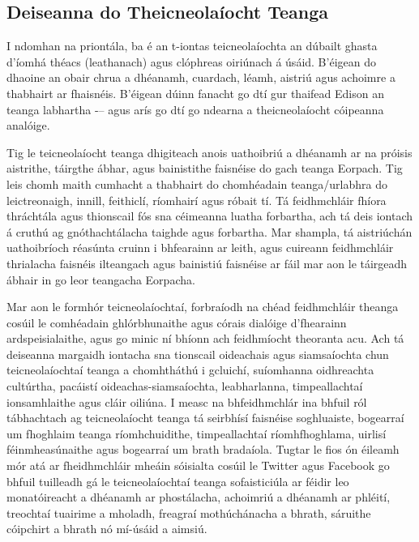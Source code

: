 \begin{multicols}{2}
\subsection{Deiseanna do Theicneolaíocht Teanga}

I ndomhan na priontála, ba é an t-iontas teicneolaíochta an dúbailt ghasta d'íomhá théacs (leathanach) agus clóphreas oiriúnach á úsáid. B’éigean do dhaoine an obair chrua a dhéanamh, cuardach, léamh, aistriú agus achoimre a thabhairt ar fhaisnéis. B’éigean dúinn fanacht go dtí gur thaifead Edison an teanga labhartha -– agus arís go dtí go ndearna a theicneolaíocht cóipeanna analóige.

Tig le teicneolaíocht teanga dhigiteach anois uathoibriú a dhéanamh ar na próisis aistrithe, táirgthe ábhar, agus bainistithe faisnéise do gach teanga Eorpach. Tig leis chomh maith cumhacht a thabhairt do chomhéadain teanga/urlabhra do leictreonaigh, innill, feithiclí, ríomhairí agus róbait tí. Tá feidhmchláir fhíora thráchtála agus thionscail fós sna céimeanna luatha forbartha, ach tá deis iontach á cruthú ag gnóthachtálacha taighde agus forbartha. Mar shampla, tá aistriúchán uathoibríoch réasúnta cruinn i bhfearainn ar leith, agus cuireann feidhmchláir thrialacha faisnéis ilteangach agus bainistiú faisnéise ar fáil mar aon le táirgeadh ábhair in go leor teangacha Eorpacha. 

Mar aon le formhór teicneolaíochtaí, forbraíodh na chéad feidhmchláir theanga cosúil le comhéadain ghlórbhunaithe agus córais dialóige d’fhearainn ardspeisialaithe, agus go minic ní bhíonn ach feidhmíocht theoranta acu. Ach tá deiseanna margaidh iontacha sna tionscail oideachais agus siamsaíochta chun teicneolaíochtaí teanga a chomhtháthú i gcluichí, suíomhanna oidhreachta cultúrtha, pacáistí oideachas-siamsaíochta, leabharlanna, timpeallachtaí ionsamhlaithe agus cláir oiliúna. I measc na bhfeidhmchlár ina bhfuil ról tábhachtach ag teicneolaíocht teanga tá seirbhísí faisnéise soghluaiste, bogearraí um fhoghlaim teanga ríomhchuidithe, timpeallachtaí ríomhfhoghlama, uirlisí féinmheasúnaithe agus bogearraí um brath bradaíola. Tugtar le fios ón éileamh mór atá ar fheidhmchláir mheáin sóisialta cosúil le Twitter agus Facebook go bhfuil tuilleadh gá le teicneolaíochtaí teanga sofaisticiúla ar féidir leo monatóireacht a dhéanamh ar phostálacha, achoimriú a dhéanamh ar phléití, treochtaí tuairime a mholadh, freagraí mothúchánacha a bhrath, sáruithe cóipchirt a bhrath nó mí-úsáid a aimsiú.


\end{multicols}
